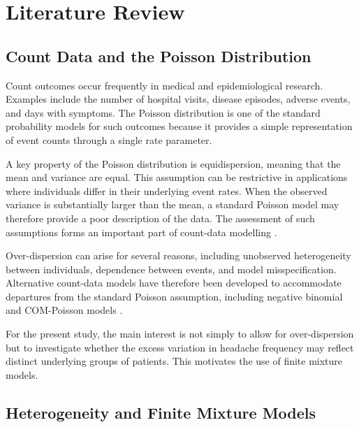 
\section{Literature Review}

\subsection{Count Data and the Poisson Distribution}

Count outcomes occur frequently in medical and epidemiological
research. Examples include the number of hospital visits, disease
episodes, adverse events, and days with symptoms. The Poisson
distribution is one of the standard probability models for such
outcomes because it provides a simple representation of event counts
through a single rate parameter.

A key property of the Poisson distribution is equidispersion, meaning
that the mean and variance are equal. This assumption can be
restrictive in applications where individuals differ in their
underlying event rates. When the observed variance is substantially
larger than the mean, a standard Poisson model may therefore provide
a poor description of the data. The assessment of such assumptions
forms an important part of count-data modelling
\citep{MolenberghsVerbeke2017}.

Over-dispersion can arise for several reasons, including unobserved
heterogeneity between individuals, dependence between events, and
model misspecification. Alternative count-data models have therefore
been developed to accommodate departures from the standard Poisson
assumption, including negative binomial and COM-Poisson models
\citep{Sellers2012,Azevedo2023}.

For the present study, the main interest is not simply to allow for
over-dispersion but to investigate whether the excess variation in
headache frequency may reflect distinct underlying groups of
patients. This motivates the use of finite mixture models.


\subsection{Heterogeneity and Finite Mixture Models}

